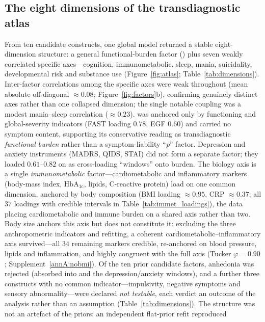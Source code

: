 \subsection{The eight dimensions of the transdiagnostic atlas}\label{subsec:eightdim}

From ten candidate constructs, one global model returned a stable eight-dimension
structure: a general functional-burden factor (\Gfac) plus seven weakly correlated
specific axes---cognition, immunometabolic, sleep, mania, suicidality, developmental
risk and substance use (Figure~\ref{fig:atlas}; Table~\ref{tab:dimensions}).
Inter-factor correlations among the specific axes were weak throughout (mean absolute
off-diagonal $\approx 0.08$; Figure~\ref{fig:factors}b), confirming genuinely distinct
axes rather than one collapsed dimension; the single notable coupling was a modest
mania--sleep correlation ($\approx 0.23$). \Gfac{} was anchored only by
functioning and global-severity indicators (FAST loading $0.78$, EGF $0.60$) and
carried no symptom content, supporting its conservative reading as transdiagnostic
\emph{functional burden} rather than a symptom-liability ``\textit{p}'' factor.
Depression and anxiety instruments (MADRS, QIDS, STAI) did not form a separate factor;
they loaded $0.61$--$0.82$ on \Gfac{} as cross-loading ``windows'' onto burden. The
biology axis is a single \emph{immunometabolic} factor---cardiometabolic and
inflammatory markers (body-mass index, $\mathrm{HbA_{1c}}$, lipids, C-reactive protein)
load on one common dimension, anchored by body composition (BMI loading $\approx 0.95$,
CRP $\approx 0.37$; all $37$ loadings with credible intervals in
Table~\ref{tab:immet_loadings}), the data placing cardiometabolic and immune burden on a
shared axis rather than two. Body size anchors this axis but does not constitute it:
excluding the three anthropometric indicators and refitting, a coherent
cardiometabolic--inflammatory axis survived---all $34$ remaining markers credible, re-anchored
on blood pressure, lipids and inflammation, and highly congruent with the full axis (Tucker
$\varphi=0.90$; Supplement~\ref{annA:nobmi}). Of the ten
prior candidate factors, anhedonia was rejected (absorbed into \Gfac{} and the
depression/anxiety windows), and a further three constructs with no common
indicator---impulsivity, negative symptoms and sensory abnormality---were declared
\emph{not testable}, each verdict an outcome of the analysis rather than an assumption
(Table~\ref{tab:dimensions}). The structure was not an artefact of the priors: an independent flat-prior refit reproduced
